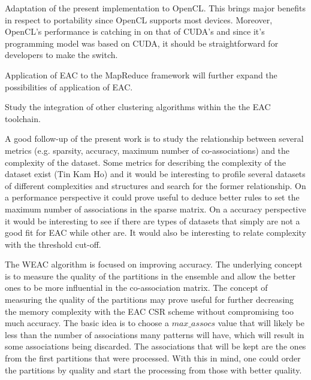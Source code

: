 Adaptation of the present implementation to OpenCL. This brings major benefits in respect to portability since OpenCL supports most devices. Moreover, OpenCL's performance is catching in on that of CUDA's and since it's programming model was based on CUDA, it should be straightforward for developers to make the switch.

Application of EAC to the MapReduce framework will further expand the possibilities of application of EAC.

Study the integration of other clustering algorithms within the the EAC toolchain.

A good follow-up of the present work is to study the relationship between several metrics (e.g. sparsity, accuracy, maximum number of co-associations) and the complexity of the dataset. Some metrics for describing the complexity of the dataset exist (Tin Kam Ho) and it would be interesting to profile several datasets of different complexities and structures and search for the former relationship.
On a performance perspective it could prove useful to deduce better rules to set the maximum number of associations in the sparse matrix.
On a accuracy perspective it would be interesting to see if there are types of datasets that simply are not a good fit for EAC while other are. It would also be interesting to relate complexity with the threshold cut-off.

The WEAC algorithm is focused on improving accuracy.
The underlying concept is to measure the quality of the partitions in the ensemble and allow the better ones to be more influential in the co-association matrix.
The concept of measuring the quality of the partitions may prove useful for further decreasing the memory complexity with the EAC CSR scheme without compromising too much accuracy.
The basic idea is to choose a $max\_assocs$ value that will likely be less than the number of associations many patterns will have, which will result in some associations being discarded.
The associations that will be kept are the ones from the first partitions that were processed.
With this in mind, one could order the partitions by quality and start the processing from those with better quality.

\cleardoublepage

